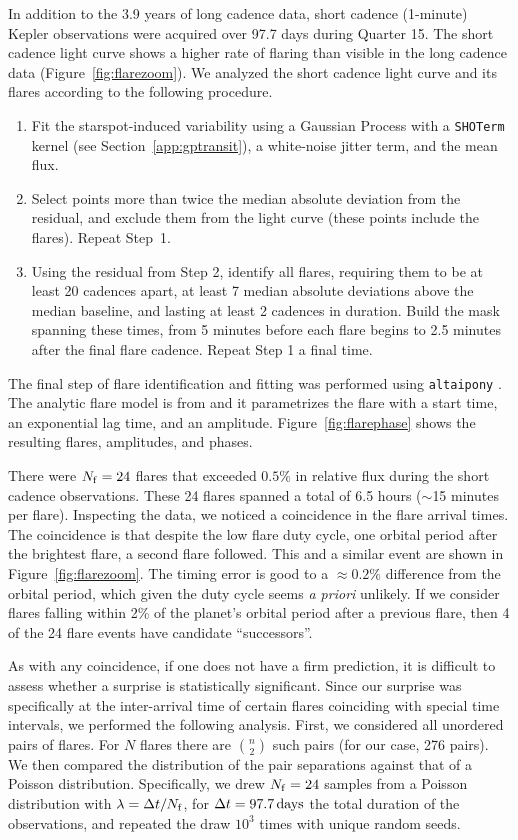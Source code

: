 \documentclass[12pt,modern,twocolumn,tighten]{aastex63}
\begin{document}
In addition to the 3.9 years of long cadence data, short cadence
(1-minute) Kepler observations were acquired over 97.7 days during
Quarter 15.  The short cadence light curve shows a higher rate of
flaring than visible in the long cadence data
(Figure~\ref{fig:flarezoom}).  We analyzed the short cadence light
curve and its flares according to the following procedure.
\begin{enumerate}
  \item Fit the starspot-induced variability using a
    Gaussian Process with a \texttt{SHOTerm} kernel (see
    Section~\ref{app:gptransit}), a white-noise jitter term, and the
    mean flux.
  \item Select points more than twice the median absolute
    deviation from the residual, and exclude them from the light
    curve (these points include the flares).  Repeat Step~1.
  \item Using the residual from Step 2, identify all flares,
    requiring them to be at least 20 cadences apart, at least 7 median
    absolute deviations above the median baseline, and lasting at
    least 2 cadences in duration.  Build the mask spanning these
    times, from 5 minutes before each flare begins to 2.5 minutes
    after the final flare cadence.  Repeat Step 1 a final time.
\end{enumerate}
The final step of flare identification and fitting was performed using \texttt{altaipony}
\citep{davenport_2016,ilin_flares_2021}.  The analytic flare model is
from \citet{davenport_2014} and it parametrizes the flare with a start
time, an exponential lag time, and an amplitude.
Figure~\ref{fig:flarephase} shows the resulting flares, amplitudes,
and phases.

There were $N_{\rm f}=24$ flares that exceeded $0.5\%$ in relative
flux during the short cadence observations.  
These 24 flares spanned a
total of 6.5 hours ($\sim$15 minutes per flare).  Inspecting the data,
we noticed a coincidence in the flare arrival
times.  The coincidence is that despite the low flare duty cycle, one
orbital period after the brightest flare, a second flare followed.
This and a similar event are shown in Figure~\ref{fig:flarezoom}.  The
timing error is good to a $\approx0.2\%$ difference from the orbital
period, which given the duty cycle seems {\it a priori} unlikely.  If
we consider flares falling within 2\% of the planet's orbital period
after a previous flare, then 4 of the 24 flare events have candidate
``successors''.

As with any coincidence, if one does not have a firm prediction, it is
difficult to assess whether a surprise is statistically significant.  Since
our surprise was specifically at the inter-arrival time of certain
flares coinciding with special time intervals, we performed the
following analysis.  First, we considered all unordered pairs of
flares.  For $N$ flares there are ${n \choose 2}$ such pairs (for our
case, 276 pairs).  We then compared the distribution of the pair
separations against that of a Poisson distribution.  Specifically,
we drew $N_{\rm f}=24$ samples from a Poisson distribution with
$\lambda = \Delta t / N_{\rm f}$, for $\Delta t=97.7\,{\rm days}$ the
total duration of the observations, and repeated the draw $10^3$ times with
unique random seeds.
\end{document}
